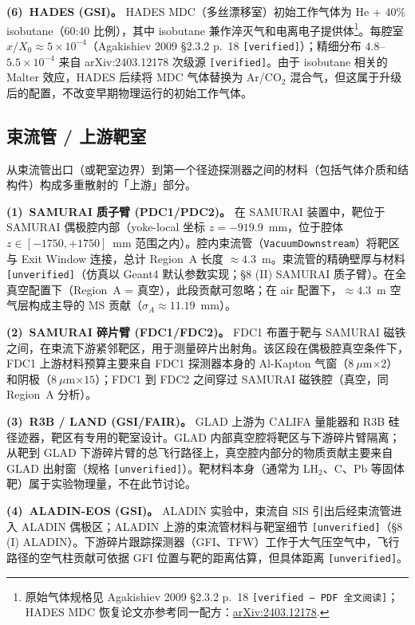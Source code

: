 \documentclass[a4paper, 11pt]{article}
\begin{document}
\textbf{(6)~HADES (GSI)。}
HADES MDC（多丝漂移室）初始工作气体为 He + 40\% isobutane（60:40 比例），其中 isobutane 兼作淬灭气和电离电子提供体\footnote{\label{fn:hades_mdc}原始气体规格见 Agakishiev 2009 §2.3.2 p.~18 \texttt{[verified --- PDF 全文阅读]}；HADES MDC 恢复论文亦参考同一配方：\href{https://arxiv.org/abs/2403.12178}{arXiv:2403.12178}.}。每腔室 $x/X_0 \approx 5\times10^{-4}$（Agakishiev 2009 §2.3.2 p.~18 \texttt{[verified]}）；精细分布 $4.8$--$5.5\times10^{-4}$ 来自 arXiv:2403.12178 次级源 \texttt{[verified]}。由于 isobutane 相关的 Malter 效应，HADES 后续将 MDC 气体替换为 Ar/CO$_2$ 混合气，但这属于升级后的配置，不改变早期物理运行的初始工作气体。

\subsection{束流管 / 上游靶室}
\label{sec:beampipe}

从束流管出口（或靶室边界）到第一个径迹探测器之间的材料（包括气体介质和结构件）构成多重散射的「上游」部分。

\textbf{(1)~SAMURAI 质子臂 (PDC1/PDC2)。}
在 SAMURAI 装置中，靶位于 SAMURAI 偶极腔内部（yoke-local 坐标 $z = -919.9$~mm，位于腔体 $z\in[-1750, +1750]$~mm 范围之内）。腔内束流管（\texttt{VacuumDownstream}）将靶区与 Exit Window 连接，总计 Region~A 长度 $\approx 4.3$~m。束流管的精确壁厚与材料 \texttt{[unverified]}（仿真以 Geant4 默认参数实现；§8 (II) SAMURAI 质子臂）。在全真空配置下（Region~A = 真空），此段贡献可忽略；在 air 配置下，$\approx 4.3$~m 空气层构成主导的 MS 贡献（$\sigma_A \approx 11.19$~mm）。

\textbf{(2)~SAMURAI 碎片臂 (FDC1/FDC2)。}
FDC1 布置于靶与 SAMURAI 磁铁之间，在束流下游紧邻靶区，用于测量碎片出射角。该区段在偶极腔真空条件下，FDC1 上游材料预算主要来自 FDC1 探测器本身的 Al-Kapton 气窗（$8~\mu$m$\times 2$）和阴极（$8~\mu$m$\times 15$）；FDC1 到 FDC2 之间穿过 SAMURAI 磁铁腔（真空，同 Region~A 分析）。

\textbf{(3)~R3B / LAND (GSI/FAIR)。}
GLAD 上游为 CALIFA 量能器和 R3B 硅径迹器，靶区有专用的靶室设计。GLAD 内部真空腔将靶区与下游碎片臂隔离；从靶到 GLAD 下游碎片臂的总飞行路径上，真空腔内部分的物质贡献主要来自 GLAD 出射窗（规格 \texttt{[unverified]}）。靶材料本身（通常为 LH$_2$、C、Pb 等固体靶）属于实验物理量，不在此节讨论。

\textbf{(4)~ALADIN-EOS (GSI)。}
ALADIN 实验中，束流自 SIS 引出后经束流管进入 ALADIN 偶极区；ALADIN 上游的束流管材料与靶室细节 \texttt{[unverified]}（§8 (I) ALADIN）。下游碎片跟踪探测器（GFI、TFW）工作于大气压空气中，飞行路径的空气柱贡献可依据 GFI 位置与靶的距离估算，但具体距离 \texttt{[unverified]}。
\end{document}
